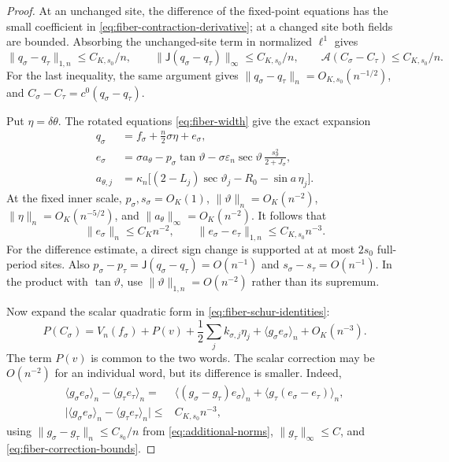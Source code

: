 \documentclass[11pt,reqno]{amsart}
\numberwithin{equation}{section}
\theoremstyle{definition}
\theoremstyle{remark}
\newcommand{\A}{\mathcal A}
\newcommand{\av}[1]{\langle #1\rangle_n}
\newcommand{\norm}[1]{\lVert #1\rVert}
\newcommand{\dd}{\delta}
\begin{document}
\begin{proof}
At an unchanged site, the difference of the fixed-point equations has the small coefficient in \eqref{eq:fiber-contraction-derivative}; at a changed site both fields are bounded. Absorbing the unchanged-site term in normalized $\ell^1$ gives
\begin{equation}\label{eq:fiber-word-difference}
 \norm{q_\sigma-q_\tau}_{1,n}\le C_{K,s_0}/n,\qquad
 \norm{\mathsf J(q_\sigma-q_\tau)}_\infty\le C_{K,s_0}/n,\qquad
 \A(C_\sigma-C_\tau)\le C_{K,s_0}/n.
\end{equation}
For the last inequality, the same argument gives
$\norm{q_\sigma-q_\tau}_n=O_{K,s_0}(n^{-1/2})$, and
$C_\sigma-C_\tau=c^0(q_\sigma-q_\tau)$.

Put $\eta=\dd\theta$. The rotated equations \eqref{eq:fiber-width} give the exact expansion
\begin{equation}\label{eq:fiber-normal-expansion}
 \begin{split}
 q_\sigma&=f_\sigma+\tfrac n2\sigma\eta+e_\sigma,\\
 e_\sigma&=\sigma a_\theta-p_\sigma\tan\vartheta
  -\sigma\varepsilon_n\sec\vartheta\,
                   \frac{s_\sigma^2}{2+J_\sigma},\\
 a_{\theta,j}&=\kappa_n\bigl[(2-L_j)\sec\vartheta_j
                              -R_0-\sin a\,\eta_j\bigr].
 \end{split}
\end{equation}
At the fixed inner scale, $p_\sigma,s_\sigma=O_K(1)$,
$\norm\vartheta_n=O_K(n^{-2})$,
$\norm\eta_n=O_K(n^{-5/2})$, and
$\norm{a_\theta}_\infty=O_K(n^{-2})$. It follows that
\begin{equation}\label{eq:fiber-correction-bounds}
 \norm{e_\sigma}_n\le C_Kn^{-2},\qquad
 \norm{e_\sigma-e_\tau}_{1,n}\le C_{K,s_0}n^{-3}.
\end{equation}
For the difference estimate, a direct sign change is supported at at most $2s_0$ full-period sites. Also
$p_\sigma-p_\tau=\mathsf J(q_\sigma-q_\tau)=O(n^{-1})$ and
$s_\sigma-s_\tau=O(n^{-1})$.
In the product with $\tan\vartheta$, use
$\norm\vartheta_{1,n}=O(n^{-2})$ rather than its supremum.

Now expand the scalar quadratic form in \eqref{eq:fiber-schur-identities}:
\begin{equation}\label{eq:fiber-quadratic-comparison}
 P(C_\sigma)=V_n(f_\sigma)+P(v)
       +\frac12\sum_j k_{\sigma,j}\eta_j
       +\av{g_\sigma e_\sigma}+O_K(n^{-3}).
\end{equation}
The term $P(v)$ is common to the two words. The scalar correction may be $O(n^{-2})$ for an individual word, but its difference is smaller. Indeed,
\[
 \begin{split}
 \av{g_\sigma e_\sigma}-\av{g_\tau e_\tau}
 ={}&\av{(g_\sigma-g_\tau)e_\sigma}
       +\av{g_\tau(e_\sigma-e_\tau)},\\
 \bigl|\av{g_\sigma e_\sigma}-\av{g_\tau e_\tau}\bigr|
 \le{}&C_{K,s_0}n^{-3},
 \end{split}
\]
using $\norm{g_\sigma-g_\tau}_n\le C_{s_0}/n$ from
\eqref{eq:additional-norms}, $\norm{g_\tau}_\infty\le C$, and
\eqref{eq:fiber-correction-bounds}.


\end{proof}
\end{document}
